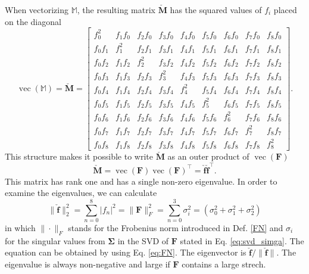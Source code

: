 When vectorizing $\mathbb{M}$, the resulting matrix $\mathbf{\check{M}}$ has the squared values of $f_i$ placed on the diagonal
\[
\operatorname{vec}(\mathbb{M})= \mathbf{\check{M}} = \begin{bmatrix} f_0^2 & f_1f_0 & f_2f_0 & f_3f_0 & f_4f_0 & f_5f_0 & f_6f_0 & f_7f_0 & f_8f_0 \\ f_0f_1 & f_1^2 & f_2f_1 & f_3f_1 & f_4f_1 & f_5f_1 & f_6f_1 & f_7f_1 & f_8f_1 \\ f_0f_2 & f_1f_2 & f_2^2 & f_3f_2 & f_4f_2 & f_5f_2 & f_6f_2 & f_7f_2 & f_8f_2 \\ f_0f_3 & f_1f_3 & f_2f_3 & f_3^2 & f_4f_3 & f_5f_3 & f_6f_3 & f_7f_3 & f_8f_3 \\ f_0f_4 & f_1f_4 & f_2f_4 & f_3f_4 & f_4^2 & f_5f_4 & f_6f_4 & f_7f_4 & f_8f_4 \\ f_0f_5 & f_1f_5 & f_2f_5 & f_3f_5 & f_4f_5 & f_5^2 & f_6f_5 & f_7f_5 & f_8f_5 \\ f_0f_6 & f_1f_6 & f_2f_6 & f_3f_6 & f_4f_6 & f_5f_6 & f_6^2 & f_7f_6 & f_8f_6 \\ f_0f_7 & f_1f_7 & f_2f_7 & f_3f_7 & f_4f_7 & f_5f_7 & f_6f_7 & f_7^2 & f_8f_7 \\ f_0f_8 & f_1f_8 & f_2f_8 & f_3f_8 & f_4f_8 & f_5f_8 & f_6f_8 & f_7f_8 & f_8^2 \end{bmatrix}.
\]
This structure makes it possible to write $\mathbf{\check{M}}$ as an outer product of $\operatorname{vec}(\mathbf{F})$
\[
\mathbf{\check{M}}= \operatorname{vec}(\mathbf{F})\operatorname{vec}(\mathbf{F})^\intercal = \mathbf{\check{f}} \mathbf{\check{f}}^\intercal.
\]
This matrix has rank one and has a single non-zero eigenvalue. In order to examine the eigenvalues, we can calculate
\[
\| \mathbf{\check{f}} \|^{2}_{2} = \sum_{n=0}^8 | f_n |^2 = \| \mathbf{F} \|^{2}_{F} = \sum_{n=0}^3 \sigma^2_i = \left( \sigma_0^2 + \sigma_1^2 + \sigma_2^2 \right)
\]
in which $\|\cdot\|_F$ stands for the Frobenius norm introduced in Def. \ref{FN} and $\sigma_i$ for the singular values from $\mathbf{\Sigma}$ in the SVD of $\mathbf{F}$ stated in Eq. \ref{eq:svd_simga}. The equation can be obtained by using Eq. \ref{eq:FN}. The eigenvector is $\mathbf{\check{f}} / \| \mathbf{\check{f}} \|$. The eigenvalue is always non-negative and large if $\mathbf{F}$ contains a large strech.

